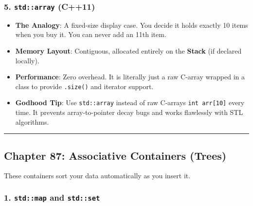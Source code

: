\hypertarget{stdarray-c11}{%
\subsubsection{\texorpdfstring{5. \texttt{std::array}
(C++11)}{5. std::array (C++11)}}\label{stdarray-c11}}

\begin{itemize}
\tightlist
\item
  \textbf{The Analogy}: A fixed-size display case. You decide it holds
  exactly 10 items when you buy it. You can never add an 11th item.
\item
  \textbf{Memory Layout}: Contiguous, allocated entirely on the
  \textbf{Stack} (if declared locally).
\item
  \textbf{Performance}: Zero overhead. It is literally just a raw
  C-array wrapped in a class to provide
  \passthrough{\lstinline!.size()!} and iterator support.
\item
  \textbf{Godhood Tip}: Use \passthrough{\lstinline!std::array!} instead
  of raw C-arrays \passthrough{\lstinline!int arr[10]!} every time. It
  prevents array-to-pointer decay bugs and works flawlessly with STL
  algorithms.
\end{itemize}

\begin{center}\rule{0.5\linewidth}{0.5pt}\end{center}

\hypertarget{chapter-87-associative-containers-trees}{%
\subsection{Chapter 87: Associative Containers
(Trees)}\label{chapter-87-associative-containers-trees}}

These containers sort your data automatically as you insert it.

\hypertarget{stdmap-and-stdset}{%
\subsubsection{\texorpdfstring{1. \texttt{std::map} and
\texttt{std::set}}{1. std::map and std::set}}\label{stdmap-and-stdset}}

